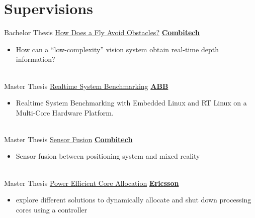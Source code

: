 \documentclass[letterpaper]{DS_class_file} %
\begin{document}
\section{Supervisions}

\begin{twenty} %
    
	\twentyitem
	{Bachelor}
	{Thesis}
    	{\hspace{0.3cm}\href{https://liu.diva-portal.org/smash/get/diva2:1678722/FULLTEXT01.pdf}{How Does a Fly Avoid Obstacles?}}
	{\href{https://www.combitech.se/}{\textbf{Combitech}}}
	{}
	{
		{\begin{itemize}
				\item How can a “low-complexity” vision system obtain real-time depth information?
		\end{itemize}}
	}
	\\
 \twentyitem
	{Master}
	{Thesis}
	{\hspace{0.3cm}\href{}{Realtime System Benchmarking}}
	{\href{https://new.abb.com/se/}{\textbf{ABB}}}
	{}
	{
		{\begin{itemize}
				\item Realtime System Benchmarking with Embedded Linux and RT Linux on a Multi-Core Hardware Platform.
		\end{itemize}}
	}
	\\

 \twentyitem
	{Master}
	{Thesis}
	{\hspace{0.3cm}\href{https://liu.diva-portal.org/smash/get/diva2:1709805/FULLTEXT01.pdf}{Sensor Fusion}}
	{\href{https://www.combitech.se/}{\textbf{Combitech}}}
	{}
	{
		{\begin{itemize}
				\item Sensor fusion between positioning system and mixed reality
		\end{itemize}}
	}
	\\

 \twentyitem
	{Master}
	{Thesis}
	{\hspace{0.3cm}\href{}{Power Efficient Core Allocation}}
	{\href{https://www.ericsson.com/en/about-us/company-facts/ericsson-worldwide/sweden/}{\textbf{Ericsson}}}
	{}
	{
		{\begin{itemize}
				\item explore different solutions to dynamically allocate and shut down processing cores using a controller
		\end{itemize}}
	}
	\\


\end{twenty}
\end{document}
